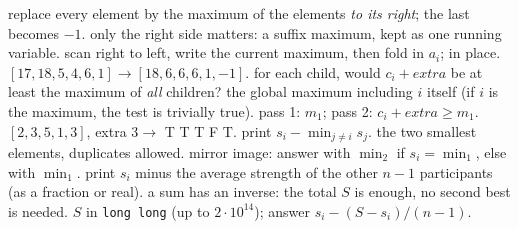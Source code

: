 \begin{variantsbox}
  {replace every element by the maximum of the elements \emph{to its right}; the last becomes $-1$.}
  {only the right side matters: a suffix maximum, kept as one running variable.}
  {scan right to left, write the current maximum, then fold in $a_i$; in place. $[17,18,5,4,6,1] \to [18,6,6,6,1,-1]$.}
  {for each child, would $c_i + \mathit{extra}$ be at least the maximum of \emph{all} children?}
  {the global maximum including $i$ itself (if $i$ is the maximum, the test is trivially true).}
  {pass 1: $m_1$; pass 2: $c_i + \mathit{extra} \ge m_1$. $[2,3,5,1,3]$, extra $3 \to$ T T T F T.}
  {print $s_i - \min_{j \ne i} s_j$.}
  {the two smallest elements, duplicates allowed.}
  {mirror image: answer with $\min_2$ if $s_i = \min_1$, else with $\min_1$.}
  {print $s_i$ minus the average strength of the other $n - 1$ participants (as a fraction or real).}
  {a sum has an inverse: the total $S$ is enough, no second best is needed.}
  {$S$ in \texttt{long long} (up to $2\cdot10^{14}$); answer $s_i - (S - s_i)/(n-1)$.}
\end{variantsbox}
